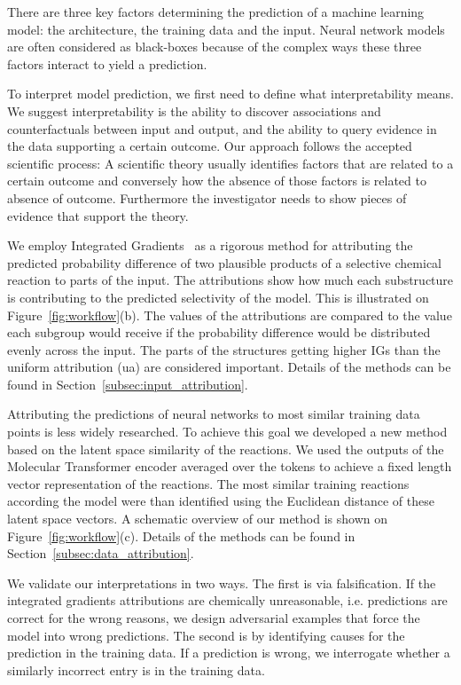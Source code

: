 There are three key factors determining the prediction of a machine learning model: the architecture, the training data and the input. Neural network models are often considered as black-boxes because of the complex ways these three factors interact to yield a prediction. 

To interpret model prediction, we first need to define what interpretability means. We suggest interpretability is the ability to discover associations and counterfactuals between input and output, and the ability to query evidence in the data supporting a certain outcome. Our approach follows the accepted scientific process: A scientific theory usually identifies factors that are related to a certain outcome and conversely how the absence of those factors is related to absence of outcome. Furthermore the investigator needs to show pieces of evidence that support the theory.

We employ Integrated Gradients~\cite{Sundararajan2017} as a rigorous method for attributing the predicted probability difference of two plausible products of a selective chemical reaction to parts of the input. The attributions show how much each substructure is contributing to the predicted selectivity of the model. This is illustrated on Figure~\ref{fig:workflow}(b). The values of the attributions are compared to the value each subgroup would receive if the probability difference would be distributed evenly across the input. The parts of the structures getting higher IGs than the uniform attribution (ua) are considered important. Details of the methods can be found in Section~\ref{subsec:input_attribution}. 

Attributing the predictions of neural networks to most similar training data points is less widely researched. To achieve this goal we developed a new method based on the latent space similarity of the reactions. We used the outputs of the Molecular Transformer encoder averaged over the tokens to achieve a fixed length vector representation of the reactions. The most similar training reactions according the model were than identified using the Euclidean distance of these latent space vectors. A schematic overview of our method is shown on Figure~\ref{fig:workflow}(c). Details of the methods can be found in Section~\ref{subsec:data_attribution}.

We validate our interpretations in two ways. The first is via falsification. If the integrated gradients attributions are chemically unreasonable, i.e. predictions are correct for the wrong reasons, we design adversarial examples that force the model into wrong predictions. The second is by identifying causes for the prediction in the training data. If a prediction is wrong, we interrogate whether a similarly incorrect entry is in the training data. 

